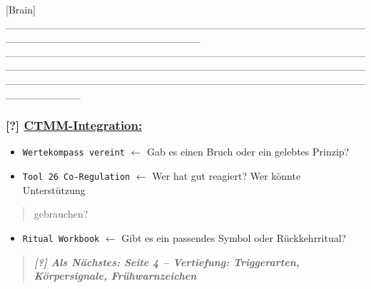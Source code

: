 [Brain] \_\_\_\_\_\_\_\_\_\_\_\_\_\_\_\_\_\_\_\_\_\_\_\_\_\_\_\_\_\_\_\_\_\_\_\_\_\_\_\_\_\_\_\_\_\_\_\_\_\_\_\_\_\_\_\_\_\_\_\_\_\_\_\_\_\_\_\_\_\_\_\_\_\_ \_\_\_\_\_\_\_\_\_\_\_\_\_\_\_\_\_\_\_\_\_\_\_\_\_\_\_\_\_\_\_\_\_\_\_\_\_\_\_\_\_\_\_\_\_\_\_\_\_\_\_\_\_\_\_\_\_\_\_\_\_\_\_\_\_\_\_\_\_\_\_\_\_\_\_\_\_\_\_\_\_\_\_\_\_\_\_\_\_\_\_\_\_\_\_\_\_\_\_\_\_\_\_\_\_\_\_\_\_\_\_\_\_\_\_\_\_\_\_\_\_\_\_\_\_\_\_\_\_\_\_\_\_\_\_\_\_\_\_\_\_\_\_\_\_\_\_\_\_\_\_\_\_\_

\hypertarget{ctmm-integration}{%
\subsubsection{\texorpdfstring{[?] \textbf{\ul{CTMM-Integration:}}}{[?] CTMM-Integration:}}\label{ctmm-integration}}

\begin{itemize}
\tightlist
\item
  \texttt{W}\texttt{erte}\texttt{k}\texttt{ompass}\texttt{\ }\texttt{vereint} $\leftarrow$ Gab es einen Bruch oder ein gelebtes Prinzip?
\item
  \texttt{T}\texttt{ool}\texttt{\ }\texttt{26}\texttt{\ C}\texttt{o}\texttt{-R}\texttt{egulation} $\leftarrow$ Wer hat gut reagiert? Wer könnte Unterstützung
\end{itemize}

\begin{quote}
gebrauchen?
\end{quote}

\begin{itemize}
\tightlist
\item
  \texttt{R}\texttt{itual}\texttt{\ W}\texttt{orkbook} $\leftarrow$ Gibt es ein passendes Symbol oder Rückkehrritual?
\end{itemize}

\begin{quote}
\emph{\textbf{[?] Als Nächstes: Seite 4 -- Vertiefung: Triggerarten, Körpersignale, Frühwarnzeichen}}
\end{quote}
